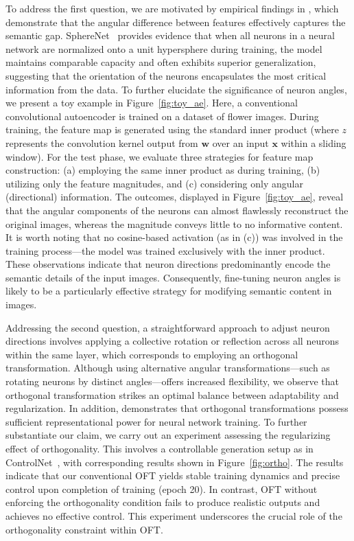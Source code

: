To address the first question, we are motivated by empirical findings in \cite{liu2018decoupled,chen2020angular}, which demonstrate that the angular difference between features effectively captures the semantic gap. SphereNet~\cite{liu2017deep} provides evidence that when all neurons in a neural network are normalized onto a unit hypersphere during training, the model maintains comparable capacity and often exhibits superior generalization, suggesting that the orientation of the neurons encapsulates the most critical information from the data. To further elucidate the significance of neuron angles, we present a toy example in Figure~\ref{fig:toy_ae}. Here, a conventional convolutional autoencoder is trained on a dataset of flower images. During training, the feature map is generated using the standard inner product (where $z$ represents the convolution kernel output from $\bm{w}$ over an input $\bm{x}$ within a sliding window). For the test phase, we evaluate three strategies for feature map construction: (a) employing the same inner product as during training, (b) utilizing only the feature magnitudes, and (c) considering only angular (directional) information. The outcomes, displayed in Figure~\ref{fig:toy_ae}, reveal that the angular components of the neurons can almost flawlessly reconstruct the original images, whereas the magnitude conveys little to no informative content. It is worth noting that no cosine-based activation (as in (c)) was involved in the training process—the model was trained exclusively with the inner product. These observations indicate that neuron directions predominantly encode the semantic details of the input images. Consequently, fine-tuning neuron angles is likely to be a particularly effective strategy for modifying semantic content in images.

Addressing the second question, a straightforward approach to adjust neuron directions involves applying a collective rotation or reflection across all neurons within the same layer, which corresponds to employing an orthogonal transformation. Although using alternative angular transformations—such as rotating neurons by distinct angles—offers increased flexibility, we observe that orthogonal transformation strikes an optimal balance between adaptability and regularization. In addition, \cite{liu2021orthogonal} demonstrates that orthogonal transformations possess sufficient representational power for neural network training. To further substantiate our claim, we carry out an experiment assessing the regularizing effect of orthogonality. This involves a controllable generation setup as in ControlNet~\cite{zhang2023adding}, with corresponding results shown in Figure~\ref{fig:ortho}. The results indicate that our conventional OFT yields stable training dynamics and precise control upon completion of training (epoch 20). In contrast, OFT without enforcing the orthogonality condition fails to produce realistic outputs and achieves no effective control. This experiment underscores the crucial role of the orthogonality constraint within OFT.

